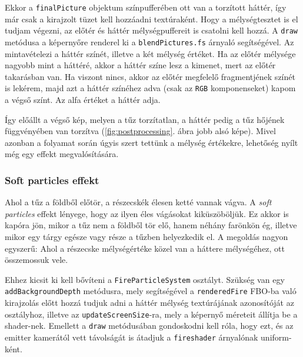 Ekkor a \texttt{finalPicture} objektum színpufferében ott van a torzított háttér, így már csak a kirajzolt tüzet kell hozzáadni textúraként. Hogy a mélységtesztet is el tudjam végezni, az előtér és háttér mélységpuffereit is csatolni kell hozzá. A \texttt{draw} metódusa a képernyőre renderel ki a \texttt{blendPictures.fs} árnyaló segítségével. Az mintavételezi a háttér színét, illetve a két mélység értéket. Ha az előtér mélysége nagyobb mint a háttéré, akkor a háttér színe lesz a kimenet, mert az előtér takarásban van. Ha viszont nincs, akkor az előtér megfelelő fragmentjének színét is lekérem, majd azt a háttér színéhez adva (csak az \texttt{RGB} komponenseket) kapom a végső színt. Az alfa értéket a háttér adja.

Így előállt a végső kép, melyen a tűz torzítatlan, a háttér pedig a tűz hőjének függvényében van torzítva (\ref{fig:postprocessing}. ábra jobb alsó képe). Mivel azonban a folyamat során úgyis szert tettünk a mélység értékekre, lehetőség nyílt még egy effekt megvalósítására.


\subsubsection{Soft particles effekt}
Ahol a tűz a földből előtör, a részecskék élesen ketté vannak vágva. A \textit{soft particles} effekt lényege, hogy az ilyen éles vágásokat kiküszöböljük. Ez akkor is kapóra jön, mikor a tűz nem a földből tör elő, hanem néhány farönkön ég, illetve mikor egy tárgy egésze vagy része a tűzben helyezkedik el. A megoldás nagyon egyszerű: Ahol a részecske mélységértéke közel van a háttere mélységéhez, ott összemossuk vele.

Ehhez kicsit ki kell bővíteni a \texttt{FireParticleSystem} osztályt. Szükség van egy \texttt{addBackgroundDepth} metódusra, mely segítségével a \texttt{renderedFire} FBO-ba való kirajzolás előtt hozzá tudjuk adni a háttér mélység textúrájának azonosítóját az osztályhoz, illetve az \texttt{updateScreenSize}-ra, mely a képernyő méreteit állítja be a shader-nek. Emellett a \texttt{draw} metódusában gondoskodni kell róla, hogy ezt, és az emitter kamerától vett távolságát is átadjuk a \texttt{fireshader} árnyalónak uniform-ként.

